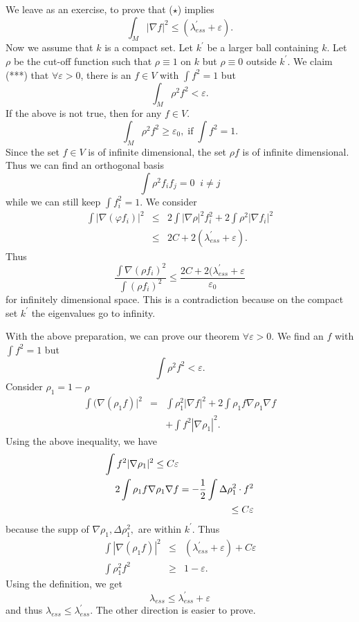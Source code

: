 We leave as an exercise, to prove that ($\star$) implies 
%
\[ \int_M |\nabla f | ^2 \leq  ( \lambda _{ess}^\prime  + \varepsilon ).
\]
%
Now we assume that $k$ is a compact set. Let $ k  ^\prime $ be a larger ball containing $k$. Let $ \rho$ be the cut-off function such that $ \rho \equiv 1 $ on $k$ but $ \rho \equiv 0 $ outside $k^\prime $. We claim (***) that $ \forall \varepsilon > 0$, there  is an $ f \in V $ with $ \int f^2 = 1 $ but
%
\[ \int _M \rho ^2 f^2 < \varepsilon. \]
%
If the above is not true, then for any $ f \in V .$ 
%
\[ \int_M \rho^2 f ^2 \geq \varepsilon _0, \; \mbox{if} \; \int f ^2 = 1 .\]
Since the set $ f \in V $ is of infinite dimensional, the set $ \rho f $ is of infinite dimensional. Thus we can find an orthogonal basis
%
\[ \int\rho^2 f _i f _j = 0 \;\; i \neq j \]
%
while we can still keep  $  \boxed{\int f _i^2 = 1 }$. We consider
%
\begin{eqnarray*}
\int | \nabla (\varphi f_i )| ^2 & \leq & 2 \int | \nabla \rho |^2 f^2_i + 2 \int \rho ^2 |\nabla f_i |^2 \\
& \leq & 2 C + 2 (\lambda _{ess} ^\prime + \varepsilon ) .
\end{eqnarray*}
%
Thus 
%
\[ \frac{\int \nabla ( \rho f_i )^2}{\int ( \rho f_i )^2 } \leq \frac{2C + 2 ( \lambda _{ess} ^\prime + \varepsilon }{\varepsilon _0} \]
%
for infinitely dimensional space. This is a contradiction because on the compact set $ k ^\prime$  the eigenvalues go to infinity.

With the above preparation, we can prove our theorem $ \forall \varepsilon > 0 $. We find an $f$ with $ \int f ^2 = 1 $ but 
%
\[ \int \rho ^2 f ^2 < \varepsilon.\]
%
Consider $ \rho_1 = 1 - \rho$
%
\begin{eqnarray*} \int ( \nabla (\rho _1 f ) |^2 &= &\int \rho^2_1 | \nabla f |^2 + 2 \int \rho_1 f  \nabla \rho _1 \nabla f \\
&& + \int f ^2 |\nabla \rho_1 |^2 .
\end{eqnarray*}
%
Using the above inequality, we have 
\begin{eqnarray*}
\lefteqn{\int f ^2 |\nabla \rho_1 |^2 \leq C \varepsilon }\\
&& 2 \int \rho_1 f \nabla \rho _1 \nabla f = - \frac{1}{2} \int \Delta \rho^2 _1 \cdot f ^2\\
&& \leq C \varepsilon 
\end{eqnarray*}
%
because the supp of $ \nabla \rho_1, \Delta \rho^2_1, $ are within $k^\prime $. Thus
%
\begin{eqnarray*}
\int |\nabla ( \rho _1 f ) |^2 &\leq & ( \lambda _{ess}^\prime + \varepsilon ) + C \varepsilon\\
\int \rho^2 _1 f ^2 & \geq & 1 - \varepsilon. 
\end{eqnarray*}
%
Using the definition, we get 
%
\[\lambda _{ess} \leq \lambda _{ess} ^\prime + \varepsilon \]
%
and thus $ \lambda _{ess} \leq \lambda _{ess} ^\prime $. The other direction is easier to prove.

